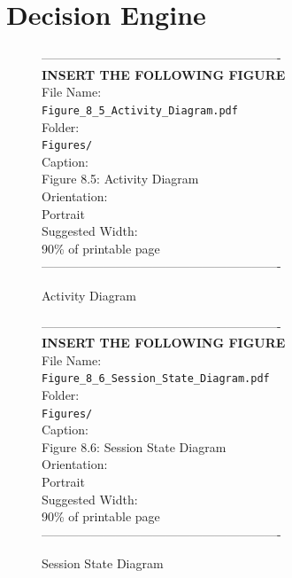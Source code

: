 \section{Decision Engine}
\vspace{1em}
\begin{figure}[htbp]
\begin{center}
----------------------------------------------------------\\
\vspace{0.5em}
\textbf{INSERT THE FOLLOWING FIGURE}\\
\vspace{1em}
File Name:\\
\texttt{Figure\_8\_5\_Activity\_Diagram.pdf}\\
\vspace{1em}
Folder:\\
\texttt{Figures/}\\
\vspace{1em}
Caption:\\
Figure 8.5: Activity Diagram\\
\vspace{1em}
Orientation:\\
Portrait\\
\vspace{1em}
Suggested Width:\\
90\% of printable page\\
\vspace{3cm}
----------------------------------------------------------
\end{center}
\caption{Activity Diagram}
\label{fig:diag_8}
\end{figure}
\vspace{1em}
\begin{figure}[htbp]
\begin{center}
----------------------------------------------------------\\
\vspace{0.5em}
\textbf{INSERT THE FOLLOWING FIGURE}\\
\vspace{1em}
File Name:\\
\texttt{Figure\_8\_6\_Session\_State\_Diagram.pdf}\\
\vspace{1em}
Folder:\\
\texttt{Figures/}\\
\vspace{1em}
Caption:\\
Figure 8.6: Session State Diagram\\
\vspace{1em}
Orientation:\\
Portrait\\
\vspace{1em}
Suggested Width:\\
90\% of printable page\\
\vspace{3cm}
----------------------------------------------------------
\end{center}
\caption{Session State Diagram}
\label{fig:diag_9}
\end{figure}
